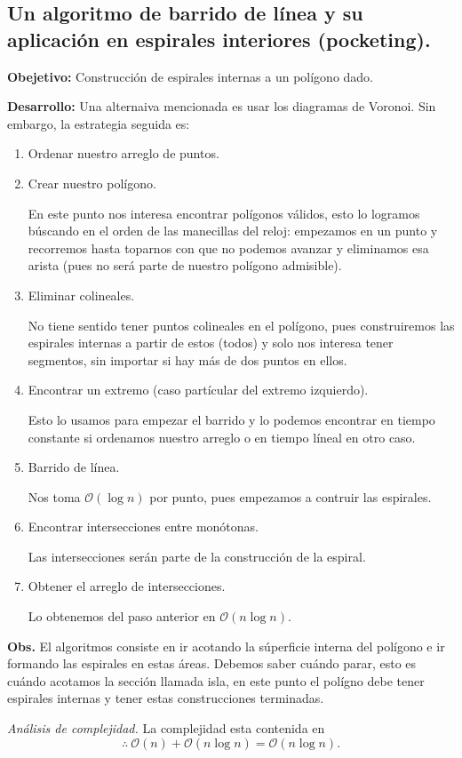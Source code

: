 \subsection[Expositor: Raúl Nuño Valdés.]{Un algoritmo de barrido de línea y su aplicación en espirales interiores (pocketing).}
\textbf{Obejetivo:} Construcción de espirales internas a un polígono dado. \newline

\textbf{Desarrollo:} Una alternaiva mencionada es usar los diagramas de Voronoi. Sin embargo, la
estrategia seguida es:
\begin{enumerate}
\item Ordenar nuestro arreglo de puntos.
\item Crear nuestro polígono. \newline
  
  En este punto nos interesa encontrar polígonos válidos, esto lo logramos búscando en
  el orden de las manecillas del reloj: empezamos en un punto y recorremos hasta toparnos
  con que no podemos avanzar y eliminamos esa arista (pues no será parte de nuestro polígono
  admisible).
\item Eliminar colineales.\newline

  No tiene sentido tener puntos colineales en el polígono, pues construiremos
  las espirales internas a partir de estos (todos) y solo nos interesa tener segmentos, sin importar si
  hay más de dos puntos en ellos.
\item Encontrar un extremo (caso partícular del extremo izquierdo).\newline
  
  Esto lo usamos para empezar el barrido y lo podemos encontrar en tiempo constante si ordenamos nuestro
  arreglo o en tiempo líneal en otro caso.
\item Barrido de línea. \newline
  
  Nos toma $\mathcal{O}(\log n)$ por punto, pues empezamos a contruir las espirales.
\item Encontrar intersecciones entre monótonas.\newline
  
  Las intersecciones serán parte de la construcción de la espiral.  
\item Obtener el arreglo de intersecciones. \newline
  
  Lo obtenemos del paso anterior en $\mathcal{O}(n \log n)$.
\end{enumerate}

\textbf{Obs.} El algoritmos consiste en ir acotando la súperficie interna del polígono e ir formando las espirales en estas
áreas. Debemos saber cuándo parar, esto es cuándo acotamos la sección llamada isla, en este punto el polígno debe tener
espirales internas y tener estas construcciones terminadas.\newline

\textit{Análisis de complejidad.} La complejidad esta contenida en
\[\therefore\: \mathcal{O}(n) + \mathcal{O}(n \log n) = \mathcal{O}(n \log n).\]
